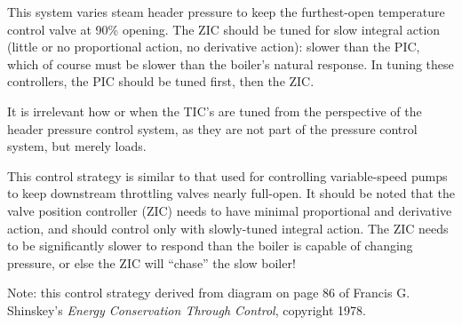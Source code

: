 This system varies steam header pressure to keep the furthest-open temperature control valve at 90\% opening.  The ZIC should be tuned for slow integral action (little or no proportional action, no derivative action): slower than the PIC, which of course must be slower than the boiler's natural response.  In tuning these controllers, the PIC should be tuned first, then the ZIC.  

It is irrelevant how or when the TIC's are tuned from the perspective of the header pressure control system, as they are not part of the pressure control system, but merely loads.







This control strategy is similar to that used for controlling variable-speed pumps to keep downstream throttling valves nearly full-open.  It should be noted that the valve position controller (ZIC) needs to have minimal proportional and derivative action, and should control only with slowly-tuned integral action.  The ZIC needs to be significantly slower to respond than the boiler is capable of changing pressure, or else the ZIC will ``chase'' the slow boiler!

\vskip 30pt

Note: this control strategy derived from diagram on page 86 of Francis G. Shinskey's {\it Energy Conservation Through Control}, copyright 1978.





